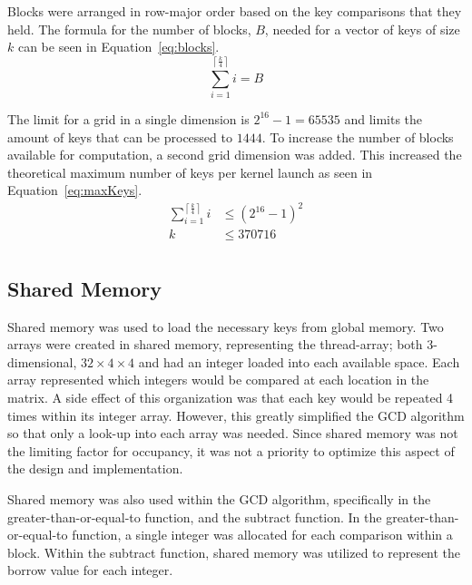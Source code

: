 \documentclass[smallextended]{svjour3}       %
\begin{document}
Blocks were arranged in row-major order based on the key comparisons that they 
held. The formula for the number of blocks, $B$, needed for a vector of keys of 
size $k$ can be seen in Equation~\ref{eq:blocks}.
\begin{equation}
   \sum_{i=1}^{\left\lceil \frac{k}{4} \right\rceil}i = B
   \label{eq:blocks}
\end{equation}

The limit for a grid in a single dimension is $2^{16} - 1 = 65535$ 
and limits the amount of keys that can be processed to $1444$. To increase 
the number of blocks available for computation, a second grid dimension was 
added. This increased the theoretical maximum number of keys per kernel 
launch as seen in Equation~\ref{eq:maxKeys}.
\begin{equation}
   \begin{split}
   \sum_{i = 1}^{\left\lceil\frac{k}{4}\right\rceil} i & \leq {\left(2^{16} - 
   1\right)}^2\\
   k & \leq 370716\\
   \end{split}
   \label{eq:maxKeys}
\end{equation}

\subsection{Shared Memory}
\label{subsec:shared}
Shared memory was used to load the necessary keys from global memory. Two 
arrays were created in shared memory, representing the thread-array; both 
3-dimensional, $32\times4\times4$ and had an integer loaded into each 
available space. Each array represented which integers would be compared at 
each location in the matrix. A side effect of this organization was that each key would be 
repeated 4 times within its integer array. However, this greatly simplified 
the GCD algorithm so that only a look-up into each array was needed. Since 
shared memory was not the limiting factor for occupancy, it was not a priority 
to optimize this aspect of the design and implementation. 

Shared memory was also used within the GCD algorithm, specifically in the 
greater-than-or-equal-to function, and the subtract function. In the 
greater-than-or-equal-to function, a single integer was allocated for each 
comparison within a block. Within the subtract function, shared memory was 
utilized to represent the borrow value for each integer. 
\end{document}
